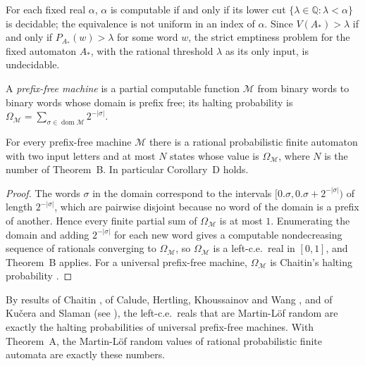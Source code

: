 \documentclass[11pt]{article}
\theoremstyle{plain}
\theoremstyle{definition}
\theoremstyle{remark}
\newcommand{\Q}{\mathbb Q}
\begin{document}
For each fixed real $\alpha$, $\alpha$ is computable if and only if its lower cut $\{\lambda\in\Q:\lambda<\alpha\}$ is decidable; the equivalence is not uniform in an index of $\alpha$. Since $V(A_*)>\lambda$ if and only if $P_{A_*}(w)>\lambda$ for some word $w$, the strict emptiness problem for the fixed automaton $A_*$, with the rational threshold $\lambda$ as its only input, is undecidable.

A \emph{prefix-free machine} is a partial computable function $\mathcal M$ from binary words to binary words whose domain is prefix free; its halting probability is $\Omega_{\mathcal M}=\sum_{\sigma\in\operatorname{dom}\mathcal M}2^{-|\sigma|}$.

\begin{corollary}\label{cor:omega}
For every prefix-free machine $\mathcal M$ there is a rational probabilistic finite automaton with two input letters and at most $N$ states whose value is $\Omega_{\mathcal M}$, where $N$ is the number of Theorem~B. In particular Corollary~D holds.
\end{corollary}

\begin{proof}
The words $\sigma$ in the domain correspond to the intervals $[0.\sigma,0.\sigma+2^{-|\sigma|})$ of length $2^{-|\sigma|}$, which are pairwise disjoint because no word of the domain is a prefix of another. Hence every finite partial sum of $\Omega_{\mathcal M}$ is at most $1$. Enumerating the domain and adding $2^{-|\sigma|}$ for each new word gives a computable nondecreasing sequence of rationals converging to $\Omega_{\mathcal M}$, so $\Omega_{\mathcal M}$ is a left-c.e.\ real in $[0,1]$, and Theorem~B applies. For a universal prefix-free machine, $\Omega_{\mathcal M}$ is Chaitin's halting probability \cite{Cha75}.
\end{proof}

\begin{remark}\label{rem:random}
By results of Chaitin \cite{Cha75}, of Calude, Hertling, Khoussainov and Wang \cite{CHKW01}, and of Ku\v{c}era and Slaman \cite{KS01} (see \cite{DH10}), the left-c.e.\ reals that are Martin-L\"of random are exactly the halting probabilities of universal prefix-free machines. With Theorem~A, the Martin-L\"of random values of rational probabilistic finite automata are exactly these numbers.
\end{remark}
\end{document}
